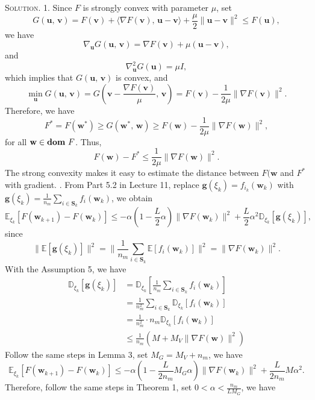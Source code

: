 \documentclass[12pt, a4paper, oneside]{ctexart}
\newenvironment{solution}{\par\noindent\textsc{Solution. }}{\\\par}
\DeclareMathOperator*{\dom}{\bf dom\,}
\begin{document}
\begin{solution}
	1. Since $F$ is strongly convex with parameter $\mu$, set 
	\[
	G(\mathbf{u},\, \mathbf{v}) = F(\mathbf{v}) + \langle\nabla F(\mathbf{v}),\, \mathbf{u - v}\rangle + \frac{\mu}{2}\|\mathbf{u - v}\|^2 \leq F(\mathbf{u}),
	\]
	we have 
	\[
	\nabla_\mathbf{u} G(\mathbf{u},\, \mathbf{v}) = \nabla F(\mathbf{v}) + \mu(\mathbf{u - v}),
	\]
	and
	\[
	\nabla^2_\mathbf{u} G(\mathbf{u}) = \mu I,
	\]
	which implies that $G(\mathbf{u},\, \mathbf{v})$ is convex, and
	\[
	\min\limits_{\mathbf{u}} G(\mathbf{u},\, \mathbf{v}) = 	G(\mathbf{v} - \frac{\nabla F(\mathbf{v})}{\mu},\, \mathbf{v}) = F(\mathbf{v}) - \frac{1}{2\mu} \|\nabla F(\mathbf{v})\|^2.
	\]
	Therefore, we have
	\[
	F^* = F(\mathbf{w}^*) \geq G(\mathbf{w}^*,\, \mathbf{w}) \geq F(\mathbf{w}) - \frac{1}{2\mu} \|\nabla F(\mathbf{w})\|^2,
	\]
	for all $\mathbf{w} \in \dom F$. Thus,
	\[
	F(\mathbf{w}) - F^* \leq \frac{1}{2\mu} \|\nabla F(\mathbf{w})\|^2.
	\]
	The strong convexity makes it easy to estimate the distance between $F(\mathbf{w}$ and $F^*$ with gradient.
	\newline{}. From Part 5.2 in Lecture 11, replace $\mathbf{g}(\xi_k) = f_{i_k}(\mathbf{w}_k)$ with $\mathbf{g}(\xi_k) = \frac{1}{n_m} \sum_{i \in \mathbf{S}_k}f_{i}(\mathbf{w}_k)$, we obtain
	\[
	\mathbb{E}_{\xi_k}[F(\mathbf{w}_{k + 1}) - F(\mathbf{w}_k)] \leq -\alpha(1 - \frac{L}{2}\alpha)\|\nabla F(\mathbf{w}_k)\|^2 + \frac{L}{2}\alpha^2 \mathbb{D}_{\xi_k}[\mathbf{g}(\xi_k)],
	\]
	since 
	\[
	\|\mathbb{E}[\mathbf{g}(\xi_k)]\|^2 = \|\frac{1}{n_m}\sum_{i \in \mathbf{S}_k}\mathbb{E}[f_i(\mathbf{w}_k)]\|^2 = \|\nabla F(\mathbf{w}_k)\|^2.
	\]
	With the Assumption 5, we have
	\begin{align*}
	\mathbb{D}_{\xi_k}[\mathbf{g}(\xi_k)] & = \mathbb{D}_{\xi_k}[\frac{1}{n_m} \sum_{i \in \mathbf{S}_k}f_{i}(\mathbf{w}_k)] \\
	& = \frac{1}{n_m^2} \sum_{i \in \mathbf{S}_k}\mathbb{D}_{\xi_k}[f_{i}(\mathbf{w}_k)] \\
	& = \frac{1}{n_m^2} \cdot n_m \mathbb{D}_{\xi_k}[f_{i}(\mathbf{w}_k)] \\
	& \leq \frac{1}{n_m}(M + M_V\|\nabla F(\mathbf{w})\|^2)
	\end{align*}
	Follow the same steps in Lemma 3, set $M_G = M_V + n_m$, we have 
	\[
	\mathbb{E}_{\xi_k}[F(\mathbf{w}_{k + 1}) - F(\mathbf{w}_k)] \leq -\alpha(1 - \frac{L}{2n_m}M_G\alpha)\|\nabla F(\mathbf{w}_k)\|^2 + \frac{L}{2n_m}M\alpha^2.
	\]
	Therefore, follow the same steps in Theorem 1, set $0 < \alpha < \frac{n_m}{LM_G}$, we have

\end{solution}
\end{document}
